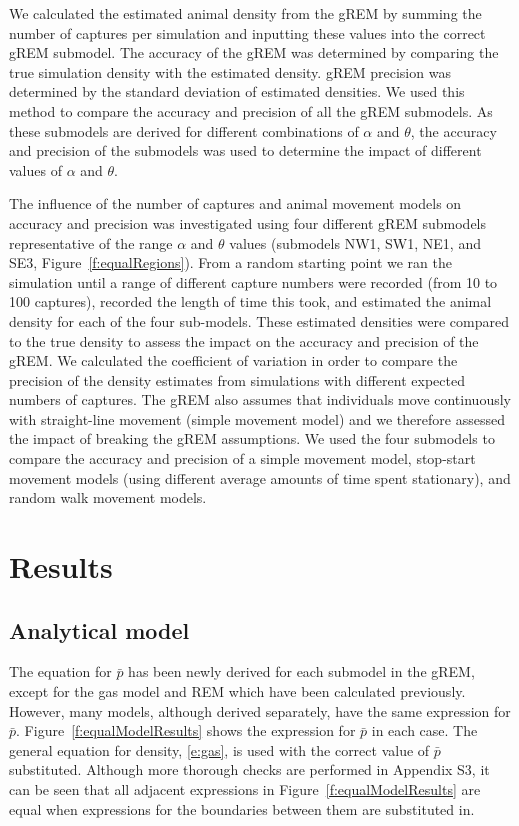 \documentclass[a4paper,10pt,reqno,oneside]{amsart}
\begin{document}
We calculated the estimated animal density from the gREM by summing the number of captures per simulation and inputting these values into the correct gREM submodel. The accuracy of the gREM was determined by comparing the true simulation density with the estimated density. gREM precision was determined by the standard deviation of estimated densities. We used this method to compare the accuracy and precision of all the gREM submodels. As these submodels are derived for different combinations of $\alpha$ and $\theta$, the accuracy and precision of the submodels was used to determine the impact of different values of $\alpha$ and $\theta$. 

The influence of the number of captures and animal movement models on accuracy and precision was investigated using four different gREM submodels representative of the range $\alpha$ and $\theta$ values (submodels NW1, SW1, NE1, and SE3, Figure~\ref{f:equalRegions}). From a random starting point we ran the simulation until a range of different capture numbers were recorded (from 10 to 100 captures), recorded the length of time this took, and estimated the animal density for each of the four sub-models. These estimated densities were compared to the true density to assess the impact on the accuracy and precision of the gREM. We calculated the coefficient of variation in order to compare the precision of the density estimates from simulations with different expected numbers of captures. The gREM also assumes that individuals move continuously with straight-line movement (simple movement model) and we therefore assessed the impact of breaking the gREM assumptions. We used the four submodels to compare the accuracy and precision of a simple movement model, stop-start movement models (using different average amounts of time spent stationary), and random walk movement models.

\section*{Results}

\subsection*{Analytical model}

The equation for $\bar{p}$ has been newly derived for each submodel in the gREM, except for the gas model and REM which have been calculated previously. However, many models, although derived separately, have the same expression for $\bar{p}$. Figure~\ref{f:equalModelResults} shows the expression for $\bar{p}$ in each case. The general equation for density, \ref{e:gas}, is used with the correct value of $\bar{p}$ substituted. Although more thorough checks are performed in Appendix S3, it can be seen that all adjacent expressions in Figure~\ref{f:equalModelResults} are equal when expressions for the boundaries between them are substituted in.
\end{document}

